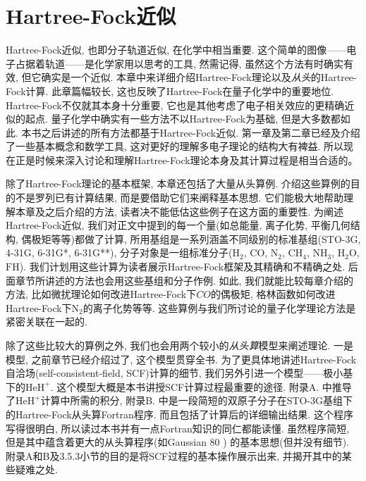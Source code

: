 \chapter{Hartree-Fock近似}
\label{ch:3}
Hartree-Fock近似, 也即分子轨道近似, 在化学中相当重要. 
这个简单的图像——电子占据着轨道——是化学家用以思考的工具, 
然需记得, 虽然这个方法有时确实有效, 但它确实是一个近似. 
本章中来详细介绍Hartree-Fock理论以及\emph{从头}的Hartree-Fock计算. 
此章篇幅较长, 这也反映了Hartree-Fock在量子化学中的重要地位. 
Hartree-Fock不仅就其本身十分重要, 它也是其他考虑了电子相关效应的更精确近似的起点. 
量子化学中确实有一些方法不以Hartree-Fock为基础, 但是大多数都如此. 
本书之后讲述的所有方法都基于Hartree-Fock近似. 
第一章及第二章已经及介绍了一些基本概念和数学工具, 这对更好的理解多电子理论的结构大有裨益. 所以现在正是时候来深入讨论和理解Hartree-Fock理论本身及其计算过程是相当合适的。

除了Hartree-Fock理论的基本框架, 
本章还包括了大量从头算例.
介绍这些算例的目的不是罗列已有计算结果, 
而是要借助它们来阐释基本思想. 
它们能极大地帮助理解本章及之后介绍的方法, 
读者决不能低估这些例子在这方面的重要性. 
为阐述Hartree-Fock近似, 
我们对正文中提到的每一个量(如总能量, 
离子化势, 
平衡几何结构, 
偶极矩等等)都做了计算, 
所用基组是一系列涵盖不同级别的标准基组(STO-3G, 
4-31G, 
6-31G*, 
6-31G**), 
分子对象是一组标准分子($\mathrm{H}_2$, 
$\mathrm{CO}$, 
$\mathrm{N}_2$, 
$\mathrm{CH}_4$, 
$\mathrm{NH}_3$, 
$\mathrm{H}_2\mathrm{O}$, 
$\mathrm{FH}$). 
我们计划用这些计算为读者展示Hartree-Fock框架及其精确和不精确之处. 
后面章节所讲述的方法也会用这些基组和分子作例. 
如此, 
我们就能比较每章介绍的方法, 
比如微扰理论如何改进Hartree-Fock下$CO$的偶极矩, 
格林函数如何改进Hartree-Fock下$\mathrm{N}_2$的离子化势等等. 
这些算例与我们所讨论的量子化学理论方法是紧密关联在一起的.


除了这些比较大的算例之外, 
我们也会用两个较小的\emph{从头算}模型来阐述理论. 
一是模型, 
之前章节已经介绍过了, 
这个模型贯穿全书. 
为了更具体地讲述Hartree-Fock自洽场(self-consistent-field, 
SCF)计算的细节, 
我们另外引进一个模型——极小基下的$\mathrm{HeH}^+$. 
这个模型大概是本书讲授SCF计算过程最重要的途径. 
附录A.
中推导了$\mathrm{HeH}^+$计算中所需的积分, 
附录B.
中是一段简短的双原子分子在STO-3G基组下的Hartree-Fock从头算Fortran程序. 
而且包括了计算后的详细输出结果. 
这个程序写得很明白, 
所以读过本书并有一点Fortran知识的同仁都能读懂. 
虽然程序简短, 
但是其中蕴含着更大的从头算程序(如Gaussian 80
)
的基本思想(但并没有细节). 
附录A和B及3.5.3小节的目的是将SCF过程的基本操作展示出来, 
并揭开其中的某些疑难之处.


